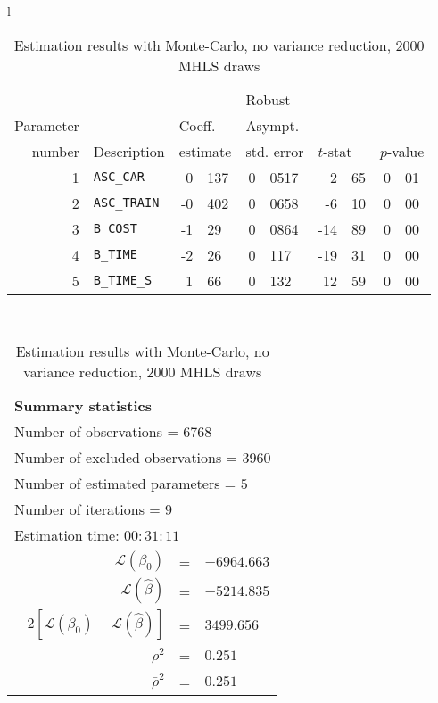 \documentclass[12pt,a4paper]{article}
\begin{document}
\begin{table}[htb]
  \begin{tabular}{l}
\begin{tabular}{rlr@{.}lr@{.}lr@{.}lr@{.}l}
         &                       &   \multicolumn{2}{l}{}    & \multicolumn{2}{l}{Robust}  &     \multicolumn{4}{l}{}   \\
Parameter &                       &   \multicolumn{2}{l}{Coeff.}      & \multicolumn{2}{l}{Asympt.}  &     \multicolumn{4}{l}{}   \\
number &  Description                     &   \multicolumn{2}{l}{estimate}      & \multicolumn{2}{l}{std. error}  &   \multicolumn{2}{l}{$t$-stat}  &   \multicolumn{2}{l}{$p$-value}   \\

\hline

1 & \lstinline$ASC_CAR$ & 0&137 & 0&0517 & 2&65 & 0&01\\
2 & \lstinline$ASC_TRAIN$ & -0&402 & 0&0658 & -6&10 & 0&00\\
3 & \lstinline$B_COST$ & -1&29 & 0&0864 & -14&89 & 0&00\\
4 & \lstinline$B_TIME$ & -2&26 & 0&117 & -19&31 & 0&00\\
5 & \lstinline$B_TIME_S$ & 1&66 & 0&132 & 12&59 & 0&00\\
\hline
\end{tabular}
\\
\begin{tabular}{rcl}
\multicolumn{3}{l}{\bf Summary statistics}\\
\multicolumn{3}{l}{ Number of observations = $6768$} \\
\multicolumn{3}{l}{ Number of excluded observations = $3960$} \\
\multicolumn{3}{l}{ Number of estimated  parameters = $5$} \\
\multicolumn{3}{l}{ Number of iterations = $9$} \\
\multicolumn{3}{l}{ Estimation time: $00:31:11$} \\
 $\mathcal{L}(\beta_0)$ &=&  $-6964.663$ \\
 $\mathcal{L}(\hat{\beta})$ &=& $-5214.835 $  \\
 $-2[\mathcal{L}(\beta_0) -\mathcal{L}(\hat{\beta})]$ &=& $3499.656$ \\
    $\rho^2$ &=&   $0.251$ \\
    $\bar{\rho}^2$ &=&    $0.251$ \\
\end{tabular}
  \end{tabular}
\caption{\label{tab:estMC}Estimation results with Monte-Carlo,
  no variance reduction, 2000 MHLS draws}
\end{table}
\end{document}
